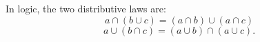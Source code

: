  In logic, the two distributive laws are:
\[ a \cap ( b \cup c ) = ( a \cap b ) \cup ( a \cap c) \]
\[ a \cup ( b \cap c ) = ( a \cup b ) \cap ( a \cup c ) . \]
